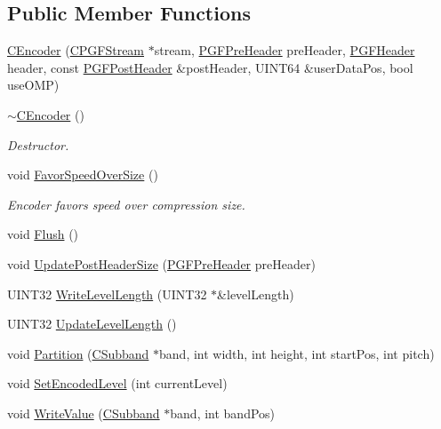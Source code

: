 \subsection*{Public Member Functions}
\begin{DoxyCompactItemize}
\item 
\mbox{\hyperlink{classCEncoder_a5b4447882da7673e0b26e5ff69df4835}{C\+Encoder}} (\mbox{\hyperlink{classCPGFStream}{C\+P\+G\+F\+Stream}} $\ast$stream, \mbox{\hyperlink{structPGFPreHeader}{P\+G\+F\+Pre\+Header}} pre\+Header, \mbox{\hyperlink{structPGFHeader}{P\+G\+F\+Header}} header, const \mbox{\hyperlink{structPGFPostHeader}{P\+G\+F\+Post\+Header}} \&post\+Header, U\+I\+N\+T64 \&user\+Data\+Pos, bool use\+O\+MP)
\item 
\mbox{\hyperlink{classCEncoder_aa6b7126b6e24bd115348fa6243756f47}{$\sim$\+C\+Encoder}} ()
\begin{DoxyCompactList}\small\item\em Destructor. \end{DoxyCompactList}\item 
void \mbox{\hyperlink{classCEncoder_aa2ffd887a5d8b2e63dfa5b7188ca49f1}{Favor\+Speed\+Over\+Size}} ()
\begin{DoxyCompactList}\small\item\em Encoder favors speed over compression size. \end{DoxyCompactList}\item 
void \mbox{\hyperlink{classCEncoder_a8e25f046e6f9bb67a7c5b3e71e5b6a32}{Flush}} ()
\item 
void \mbox{\hyperlink{classCEncoder_adcacefab75d6ab0e562d854f31d242ff}{Update\+Post\+Header\+Size}} (\mbox{\hyperlink{structPGFPreHeader}{P\+G\+F\+Pre\+Header}} pre\+Header)
\item 
U\+I\+N\+T32 \mbox{\hyperlink{classCEncoder_ad29dd5328d1198a672599034e7315922}{Write\+Level\+Length}} (U\+I\+N\+T32 $\ast$\&level\+Length)
\item 
U\+I\+N\+T32 \mbox{\hyperlink{classCEncoder_a93d5e9bf075e804eb9626d4b0292c4dd}{Update\+Level\+Length}} ()
\item 
void \mbox{\hyperlink{classCEncoder_a297a9fdb00fadf770852f215ab1c799c}{Partition}} (\mbox{\hyperlink{classCSubband}{C\+Subband}} $\ast$band, int width, int height, int start\+Pos, int pitch)
\item 
void \mbox{\hyperlink{classCEncoder_acff251105003f4a4376a01180dbdc757}{Set\+Encoded\+Level}} (int current\+Level)
\item 
void \mbox{\hyperlink{classCEncoder_a56e4a13cb14295ffb016e9efef5ebcd8}{Write\+Value}} (\mbox{\hyperlink{classCSubband}{C\+Subband}} $\ast$band, int band\+Pos)

\end{DoxyCompactItemize}
